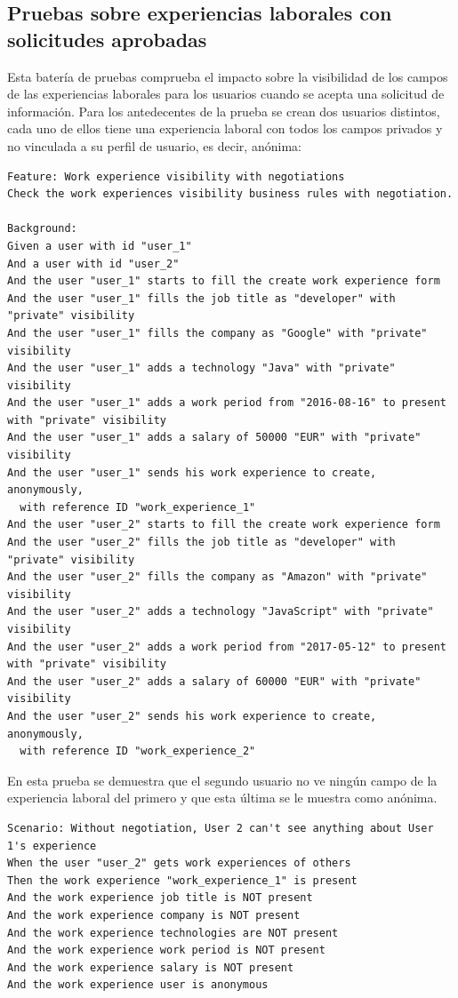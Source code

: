 \documentclass[a4paper, 12pt]{book}
\begin{document}
    \subsection{Pruebas sobre experiencias laborales con solicitudes aprobadas}
    Esta batería de pruebas comprueba el impacto sobre la visibilidad de los campos de las experiencias laborales para los usuarios
    cuando se acepta una solicitud de información.
    Para los antedecentes de la prueba se crean dos usuarios distintos, cada uno de ellos tiene una experiencia laboral
    con todos los campos privados y no vinculada a su perfil de usuario, es decir, anónima:
        {\scriptsize
    \linespread{1}
    \begin{verbatim}
Feature: Work experience visibility with negotiations
Check the work experiences visibility business rules with negotiation.

Background:
Given a user with id "user_1"
And a user with id "user_2"
And the user "user_1" starts to fill the create work experience form
And the user "user_1" fills the job title as "developer" with "private" visibility
And the user "user_1" fills the company as "Google" with "private" visibility
And the user "user_1" adds a technology "Java" with "private" visibility
And the user "user_1" adds a work period from "2016-08-16" to present with "private" visibility
And the user "user_1" adds a salary of 50000 "EUR" with "private" visibility
And the user "user_1" sends his work experience to create, anonymously,
  with reference ID "work_experience_1"
And the user "user_2" starts to fill the create work experience form
And the user "user_2" fills the job title as "developer" with "private" visibility
And the user "user_2" fills the company as "Amazon" with "private" visibility
And the user "user_2" adds a technology "JavaScript" with "private" visibility
And the user "user_2" adds a work period from "2017-05-12" to present with "private" visibility
And the user "user_2" adds a salary of 60000 "EUR" with "private" visibility
And the user "user_2" sends his work experience to create, anonymously,
  with reference ID "work_experience_2"
    \end{verbatim}
    }
    En esta prueba se demuestra que el segundo usuario no ve ningún campo de la experiencia laboral del primero
    y que esta última se le muestra como anónima.
        {\scriptsize
    \linespread{1}
    \begin{verbatim}
Scenario: Without negotiation, User 2 can't see anything about User 1's experience
When the user "user_2" gets work experiences of others
Then the work experience "work_experience_1" is present
And the work experience job title is NOT present
And the work experience company is NOT present
And the work experience technologies are NOT present
And the work experience work period is NOT present
And the work experience salary is NOT present
And the work experience user is anonymous
    \end{verbatim}
    }
\end{document}
